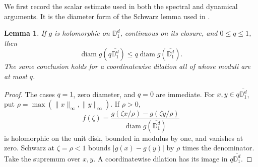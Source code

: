 \documentclass[reqno]{amsart}
\newtheorem{lemma}[theorem]{Lemma}
\theoremstyle{definition}
\theoremstyle{remark}
\newcommand{\D}{\mathbb D}
\begin{document}
We first record the scalar estimate used in both the spectral and
dynamical arguments.  It is the diameter form of the Schwarz lemma
used in \cite[Theorem~2]{BGLW26}.

\begin{lemma}\label{spec:schwarz}
If \(g\) is holomorphic on \(\D_1^d\), continuous on its closure,
and \(0\le q\le1\), then
\[
 \operatorname{diam}g(q\overline{\D_1^d})
 \le q\operatorname{diam}g(\overline{\D_1^d}).
\]
The same conclusion holds for a coordinatewise dilation all of whose
moduli are at most \(q\).
\end{lemma}
\begin{proof}
The cases \(q=1\), zero diameter, and \(q=0\) are immediate.
For \(x,y\in q\overline{\D_1^d}\), put
\(\rho=\max(\|x\|_\infty,\|y\|_\infty)\).  If \(\rho>0\),
\[
 f(\zeta)=
 \frac{g(\zeta x/\rho)-g(\zeta y/\rho)}
 {\operatorname{diam}g(\overline{\D_1^d})}
\]
is holomorphic on the unit disk, bounded in modulus by one, and
vanishes at zero.  Schwarz at \(\zeta=\rho<1\) bounds
\(|g(x)-g(y)|\) by \(\rho\) times the denominator.  Take the
supremum over \(x,y\).  A coordinatewise dilation has its image in
\(q\overline{\D_1^d}\).
\end{proof}
\end{document}
